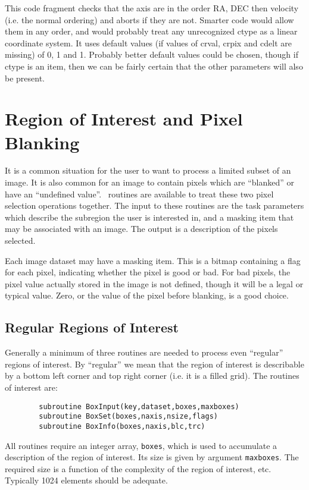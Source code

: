 This code fragment checks that the  axis are in the order RA, DEC then velocity
(i.e. the normal ordering)
and aborts if they are not. Smarter code would allow them in any order, and
would probably treat any unrecognized ctype as a linear coordinate system.
It uses default values (if values of crval, crpix and cdelt are missing)
of 0, 1 and 1. Probably better default values could be chosen, though if
ctype is an item, then we can be fairly certain that the other parameters
will also be present.

\section{Region of Interest and Pixel Blanking}
It is a common situation for the user to want to process a limited subset
of an image. It is also common for an image to contain pixels which are
``blanked'' or have an ``undefined value''. \miriad\ routines are available to
treat these two pixel selection operations together. The input to these
routines are the task parameters which describe the subregion the user
is interested in, and a masking item that may be associated with an image.
The output is a description of the pixels selected.

Each image dataset may have a masking item. This
is a bitmap containing a flag for each pixel, indicating
whether the pixel is good or bad. For bad pixels, the pixel value actually
stored
in the image is not defined, though it will be a legal or typical value.
Zero, or the value of the pixel before blanking, is a good choice.

\subsection{Regular Regions of Interest}
Generally a minimum of three routines are needed to process even ``regular''
regions of interest. By ``regular'' we mean that the region of interest is
describable by a bottom left corner and top right corner (i.e. it is a filled
grid). The routines of interest are:
\begin{verbatim}
        subroutine BoxInput(key,dataset,boxes,maxboxes)
        subroutine BoxSet(boxes,naxis,nsize,flags)
        subroutine BoxInfo(boxes,naxis,blc,trc)
\end{verbatim}
All routines require an integer array, {\tt boxes}, which is used to
accumulate a description of the region of interest. Its size is given
by argument {\tt maxboxes}. The required size is a function of the
complexity of the region of interest, etc. Typically 1024 elements
should be adequate.

